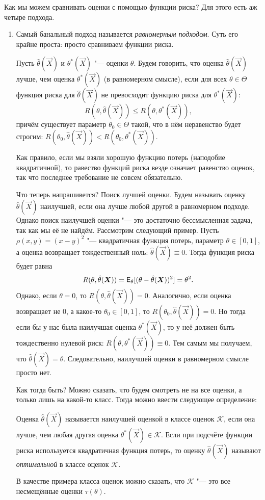 Как мы можем сравнивать оценки с помощью функции риска? Для этого есть аж четыре подхода.
\begin{enumerate}
	\item\label{lec2:uniform} Самый банальный подход называется \textit{равномерным подходом}. Суть его крайне проста: просто сравниваем функции риска.
	\begin{definition}
		Пусть $\hat{\theta}(\vec{X})$ и $\theta^{*}(\vec{X})$ "--- оценки $\theta$. Будем говорить, что оценка $\hat{\theta}(\vec{X})$ лучше, чем оценка $\theta^{*}(\vec{X})$ (в равномерном смысле), если для всех $\theta \in \Theta$ функция риска для $\hat{\theta}(\vec{X})$ не превосходит функцию риска для $\theta^{*}(\vec{X})$:
		\[
			R(\theta, \hat{\theta}(\vec{X})) \leq R(\theta, \theta^{*}(\vec{X})),
		\]
		причём существует параметр $\theta_{0} \in \Theta$ такой, что в нём неравенство будет строгим: $R(\theta_{0}, \hat{\theta}(\vec{X})) < R(\theta_{0}, \theta^{*}(\vec{X}))$.
	\end{definition}
	
	Как правило, если мы взяли хорошую функцию потерь (наподобие квадратичной), то равество функций риска везде означает равенство оценок, так что последнее требование не совсем обязательно.
	
	Что теперь напрашивется? Поиск лучшей оценки. Будем называть оценку $\hat{\theta}(\vec{X})$ наилучшей, если она лучше любой другой в равномерном подходе. Однако поиск наилучшей оценки "--- это достаточно бессмысленная задача, так как мы её не найдём. Рассмотрим следующий пример. Пусть $\rho(x, y) = (x - y)^{2}$ "--- квадратичная функция потерь, параметр $\theta \in [0, 1]$, а оценка возвращает тождественный ноль: $\hat{\theta}(\vec{X}) \equiv 0$. Тогда функция риска будет равна
	\[
		R(\theta, \hat{\theta}(\bm{X})) = \operatorname{\mathsf{E}}_{\theta}[(\theta - \hat{\theta}(\bm{X}))^{2}] = \theta^{2}.
	\]
	Однако, если $\theta = 0$, то $R(\theta, \hat{\theta}(\vec{X})) = 0$. Аналогично, если оценка возвращает не 0, а какое-то $\theta_{0} \in [0, 1]$, то $R(\theta_{0}, \hat{\theta}(\vec{X})) = 0$. Но тогда если бы у нас была наилучшая оценка $\theta^{*}(\vec{X})$, то у неё должен быть тождественно нулевой риск: $R(\theta, \theta^{*}(\vec{X})) \equiv 0$. Тем самым мы получаем, что $\hat{\theta}(\vec{X}) = \theta$. Следовательно, наилучшей оценки в равномерном смысле просто нет.
	
	Как тогда быть? Можно сказать, что будем смотреть не на все оценки, а только лишь на какой-то класс. Тогда можно ввести следующее определение:
	\begin{definition}
		Оценка $\hat{\theta}(\vec{X})$ называется наилучшей оценкой в классе оценок $\mathcal{K}$, если она лучше, чем любая другая оценка $\theta^{*}(\vec{X}) \in \mathcal{K}$. Если при подсчёте функции риска используется квадратичная функция потерь, то оценку $\hat{\theta}(\vec{X})$ называют \emph{оптимальной} в классе оценок $\mathcal{K}$.
	\end{definition}
	В качестве примера класса оценок можно сказать, что $\mathcal{K}$ "--- это все несмещённые оценки $\tau(\theta)$.
	

\end{enumerate}
